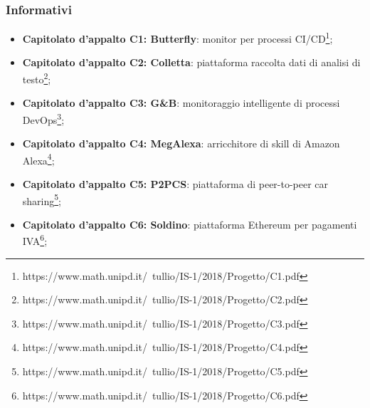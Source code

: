\subsubsection{Informativi}
\begin{itemize}
	\item \textbf{Capitolato d'appalto C1: Butterfly}: monitor per processi CI/CD\footnote{https://www.math.unipd.it/~tullio/IS-1/2018/Progetto/C1.pdf};
	
	\item \textbf{Capitolato d'appalto C2: Colletta}: piattaforma raccolta dati di analisi di testo\footnote{https://www.math.unipd.it/~tullio/IS-1/2018/Progetto/C2.pdf};
	
	\item \textbf{Capitolato d'appalto C3: G\&B}: monitoraggio intelligente di processi DevOps\footnote{https://www.math.unipd.it/~tullio/IS-1/2018/Progetto/C3.pdf};
	
	\item \textbf{Capitolato d'appalto C4: MegAlexa}: arricchitore di skill di Amazon Alexa\footnote{https://www.math.unipd.it/~tullio/IS-1/2018/Progetto/C4.pdf};
	
	\item \textbf{Capitolato d'appalto C5: P2PCS}: piattaforma di peer-to-peer car sharing\footnote{https://www.math.unipd.it/~tullio/IS-1/2018/Progetto/C5.pdf};
	
	\item \textbf{Capitolato d'appalto C6: Soldino}: piattaforma Ethereum per pagamenti IVA\footnote{https://www.math.unipd.it/~tullio/IS-1/2018/Progetto/C6.pdf};
\end{itemize}

	
	

